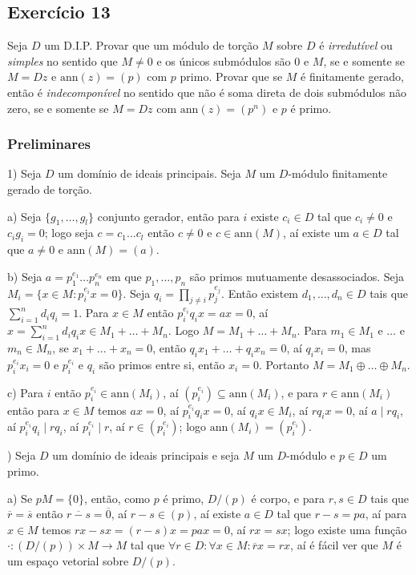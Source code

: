 \documentclass[10pt,a4paper]{article}
\begin{document}
\subsection*{Exercício 13}

Seja $D$ um D.I.P. Provar que um módulo de torção $M$ sobre $D$ é \textit{irredutível} ou \textit{simples} no sentido que $M\neq 0$ e os únicos submódulos são $0$ e $M$, se e somente se $M=Dz$ e $\mathrm{ann}(z)=(p)$ com $p$ primo. Provar que se $M$ é finitamente gerado, então é \textit{indecomponível} no sentido que não é soma direta de dois submódulos não zero, se e somente se $M=Dz$ com $\mathrm{ann}(z)=(p^n)$ e $p$ é primo.

\subsubsection*{Preliminares}

1) Seja $D$ um domínio de ideais principais. Seja $M$ um $D$-módulo finitamente gerado de torção.

\medskip
\noindent
a) Seja $\{g_1,\dots,g_l\}$ conjunto gerador, então para $i$ existe $c_i\in D$ tal que $c_i\neq 0$ e $c_ig_i=0$; logo seja $c=c_1\dots c_l$ então $c\neq 0$ e $c\in\mathrm{ann}(M)$, aí existe um $a\in D$ tal que $a\neq 0$ e $\mathrm{ann}(M)=(a)$.

\medskip
\noindent
b) Seja $a=p_1^{e_1}\dots p_n^{e_n}$ em que $p_1,\dots,p_n$ são primos mutuamente desassociados. Seja $M_i=\{x\in M:p_i^{e_i}x=0\}$. Seja $q_i=\prod_{j\neq i}p_j^{e_j}$. Então existem $d_1,\dots,d_n\in D$ tais que $\sum_{i=1}^nd_iq_i=1$. Para $x\in M$ então $p_i^{e_i}q_ix=ax=0$, aí $x=\sum_{i=1}^nd_iq_ix\in M_1+\dots+M_n$. Logo $M=M_1+\dots+M_n$. Para $m_1\in M_1$ e $\dots$ e $m_n\in M_n$, se $x_1+\dots+x_n=0$, então $q_ix_1+\dots+q_ix_n=0$, aí $q_ix_i=0$, mas $p_i^{e_i}x_i=0$ e $p_i^{e_i}$ e $q_i$ são primos entre si, então $x_i=0$. Portanto $M=M_1\oplus\dots\oplus M_n$.

\medskip
\noindent
c) Para $i$ então $p_i^{e_i}\in\mathrm{ann}(M_i)$, aí $(p_i^{e_i})\subseteq\mathrm{ann}(M_i)$, e para $r\in\mathrm{ann}(M_i)$ então para $x\in M$ temos $ax=0$, aí $p_i^{e_i}q_ix=0$, aí $q_ix\in M_i$, aí $rq_ix=0$, aí $a\mid rq_i$, aí $p_i^{e_i}q_i\mid rq_i$, aí $p_i^{e_i}\mid r$, aí $r\in(p_i^{e_i})$; logo $\mathrm{ann}(M_i)=(p_i^{e_i})$.

\medskip
{}) Seja $D$ um domínio de ideais principais e seja $M$ um $D$-módulo e $p\in D$ um primo.

\medskip
\noindent
a) Se $pM=\{0\}$, então, como $p$ é primo, $D/(p)$ é corpo, e para $r,s\in D$ tais que $\overline{r}=\overline{s}$ então $\overline{r-s}=\overline{0}$, aí $r-s\in(p)$, aí existe $a\in D$ tal que $r-s=pa$, aí para $x\in M$ temos $rx-sx=(r-s)x=pax=0$, aí $rx=sx$; logo existe uma função $\cdot:(D/(p))\times M\rightarrow M$ tal que $\forall r\in D:\forall x\in M:\overline{r}x=rx$, aí é fácil ver que $M$ é um espaço vetorial sobre $D/(p)$.
\end{document}
